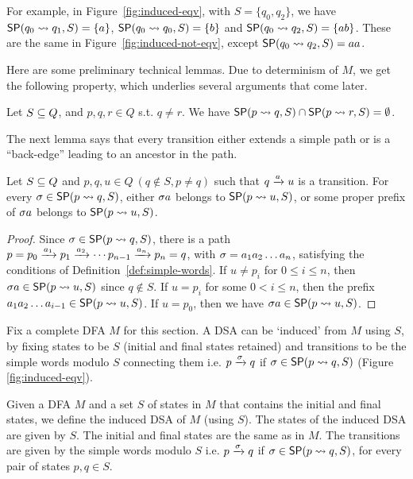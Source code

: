 For example, in Figure~\ref{fig:induced-eqv}, with $S = \{q_0, q_2\}$,
we have $\mathsf{SP}(q_0 \rightsquigarrow q_1, S) = \{a\}$, $\mathsf{SP}(q_0 \rightsquigarrow q_0, S) = \{b\}$
and $\mathsf{SP}(q_0 \rightsquigarrow q_2, S) = \{ab\}$. These are the same in
Figure~\ref{fig:induced-not-eqv}, except $\mathsf{SP}(q_0 \rightsquigarrow q_2, S) = aa$.

Here are some preliminary technical lemmas.
Due to determinism of $M$, we get the following 
property, which underlies several arguments that come later.

\begin{lemma}
  Let $S \subseteq Q$, and $p, q, r \in Q$ s.t. $q \neq r$. We have
  $\mathsf{SP}(p \rightsquigarrow q, S) \cap \mathsf{SP}(p \rightsquigarrow r, S) = \emptyset$.
\end{lemma}

The next lemma says that every transition either extends a simple path
or is a ``back-edge'' leading to an ancestor in the path.

\begin{lemma}\label{lem:spaths-property}
  Let $S \subseteq Q$ and $p, q, u \in Q ~ (q \notin S, p \ne q) $ such
  that $q \xrightarrow{a} u$ is a transition. For every
  $\sigma \in \mathsf{SP}(p \rightsquigarrow q, S)$, either $\sigma a$ belongs to $\mathsf{SP}(p \rightsquigarrow u, S)$, or some
  proper prefix of $\sigma a$ belongs to $\mathsf{SP}(p \rightsquigarrow u, S)$.
\end{lemma}
\begin{proof}
  Since $\sigma \in \mathsf{SP}(p \rightsquigarrow q, S)$, there is a path
  $p = p_0 \xrightarrow{a_1} p_1 \xrightarrow{a_2} \cdots p_{n-1} \xrightarrow{a_n} p_n = q$,
  with $\sigma = a_1 a_2 \dots a_n$, satisfying the conditions of
  Definition~\ref{def:simple-words}. If $u \neq p_i$ for
  $0 \le i \le n$, then $\sigma a \in \mathsf{SP}(p \rightsquigarrow u, S)$ since $q \notin
  S$. If $u = p_i$ for some $0 < i \le n$, then the prefix
  $a_1 a_2 \dots a_{i-1} \in \mathsf{SP}(p \rightsquigarrow u, S)$. If $u = p_0$, then we
  have $\sigma a \in \mathsf{SP}(p \rightsquigarrow u, S)$.
\end{proof}


Fix a complete DFA $M$ for this section. A DSA can be `induced' from
$M$ using $S$, by fixing states to be $S$ (initial and final states
retained) and transitions to be the simple words modulo $S$ connecting
them i.e. $p \xrightarrow{\sigma} q$ if $\sigma \in \mathsf{SP}(p \rightsquigarrow q, S)$ (Figure
\ref{fig:induced-eqv}).

\begin{definition}\label{def:induced-dsa}
  Given a DFA $M$ and a set $S$ of states in $M$ that contains the
  initial and final states, we define the induced DSA of $M$ (using
  $S$). The states of the induced DSA are given by $S$. The initial
  and final states are the same as in $M$. The transitions are given
  by the simple words modulo $S$ i.e. $p \xrightarrow{\sigma} q$ if
  $\sigma \in \mathsf{SP}(p \rightsquigarrow q, S)$, for every pair of states $p, q \in S$.
\end{definition}

